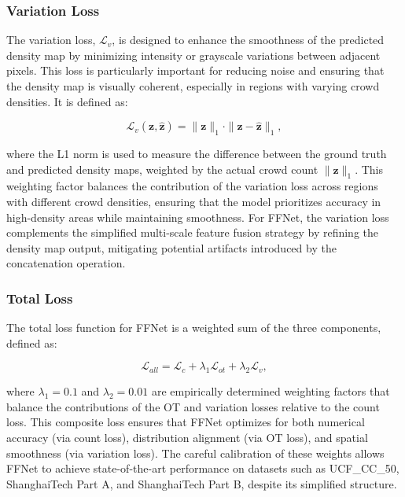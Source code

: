 \subsubsection{Variation Loss}
The variation loss, $\mathcal{L}_v$, is designed to enhance the smoothness of the predicted density map by minimizing intensity or grayscale variations between adjacent pixels. This loss is particularly important for reducing noise and ensuring that the density map is visually coherent, especially in regions with varying crowd densities. It is defined as:

\begin{equation}
\mathcal{L}_v(\mathbf{z}, \hat{\mathbf{z}}) = \|\mathbf{z}\|_1 \cdot \|\mathbf{z} - \hat{\mathbf{z}}\|_1,
\end{equation}

where the L1 norm is used to measure the difference between the ground truth and predicted density maps, weighted by the actual crowd count $\|\mathbf{z}\|_1$. This weighting factor balances the contribution of the variation loss across regions with different crowd densities, ensuring that the model prioritizes accuracy in high-density areas while maintaining smoothness. For FFNet, the variation loss complements the simplified multi-scale feature fusion strategy by refining the density map output, mitigating potential artifacts introduced by the concatenation operation.

\subsubsection{Total Loss}
The total loss function for FFNet is a weighted sum of the three components, defined as:

\begin{equation}
\mathcal{L}_{all} = \mathcal{L}_c + \lambda_1 \mathcal{L}_{ot} + \lambda_2 \mathcal{L}_v,
\end{equation}

where $\lambda_1 = 0.1$ and $\lambda_2 = 0.01$ are empirically determined weighting factors that balance the contributions of the OT and variation losses relative to the count loss. This composite loss ensures that FFNet optimizes for both numerical accuracy (via count loss), distribution alignment (via OT loss), and spatial smoothness (via variation loss). The careful calibration of these weights allows FFNet to achieve state-of-the-art performance on datasets such as UCF\_CC\_50, ShanghaiTech Part A, and ShanghaiTech Part B, despite its simplified structure.

